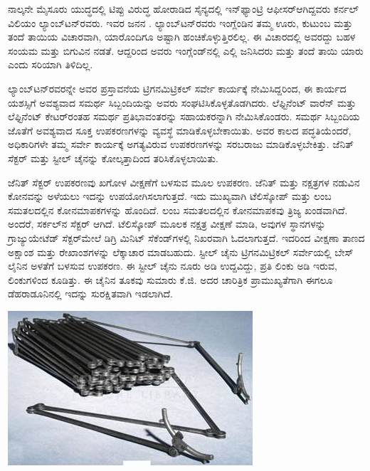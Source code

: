 ನಾಲ್ಕನೇ ಮೈಸೂರು ಯುದ್ಧದಲ್ಲಿ ಟಿಪ್ಪು ವಿರುದ್ಧ ಹೋರಾಡಿದ ಸೈನ್ಯದಲ್ಲಿ ಇನ್​ಫ್ಯಾಂಟ್ರಿ ಆಫೀಸರ್​ ಆಗಿದ್ದವರು ಕರ್ನಲ್​ ವಿಲಿಯಂ ಲ್ಯಾಂಬ್​ಟನ್​ರವರು. ಇವರ ಜನನ . ಲ್ಯಾಂಬ್​ಟನ್​ರವರು ಇಂಗ್ಲೆಂಡಿನ ತಮ್ಮ ಊರು, ಕುಟುಂಬ ಮತ್ತು ತಂದೆ ತಾಯಿಯ ವಿಚಾರವಾಗಿ, ಯಾರೊಂದಿಗೂ ಅಷ್ಟಾಗಿ ಹಂಚಿಕೊಳ್ಳುತ್ತಿರಲಿಲ್ಲ. ಈ ವಿಚಾರದಲ್ಲಿ ಅವರದ್ದು ಬಹಳ ಸಂಯಮ ಮತ್ತು ಬಿಗುವಿನ ನಡತೆ. ಆದ್ದರಿಂದ ಅವರು ಇಂಗ್ಲೆಂಡ್​ನಲ್ಲಿ ಎಲ್ಲಿ ಜನಿಸಿದರು ಮತ್ತು ತಂದೆ ತಾಯಿ ಯಾರು ಎಂದು ಸರಿಯಾಗಿ ತಿಳಿದಿಲ್ಲ.

ಲ್ಯಾಂಬ್​ಟನ್​ರವರನ್ನೇ ಅವರ ಪ್ರಸ್ತಾವನೆಯ ಟ್ರಿಗನಮಿಟ್ರಿಕಲ್​ ಸರ್ವೇ ಕಾರ್ಯಕ್ಕೆ ನೇಮಿಸಿದ್ದರಿಂದ, ಈ ಕಾರ್ಯದ ಯಶಸ್ಸಿಗೆ ಅವಶ್ಯವಾದ ಸಮರ್ಥ ಸಿಬ್ಬಂದಿಯನ್ನು ಅವರು ಸಂಘಟಿಸಿಕೊಳ್ಳತೊಡಗಿದರು. ಲೆಫ್ಟಿನೆಂಟ್​ ವಾರೆನ್​ ಮತ್ತು ಲೆಫ್ಟಿನೆಂಟ್​ ಕೇಟರ್​ರಂತಹ ಸಮರ್ಥ ಪ್ರತಿಭಾವಂತರನ್ನು ಸಹಾಯಕರನ್ನಾಗಿ ನೇಮಿಸಿಕೊಂಡರು. ಸಮರ್ಥ ಸಿಬ್ಬಂದಿಯ ಜೊತೆಗೆ ಅವಶ್ಯವಾದ ಸೂಕ್ತ ಉಪಕರಣಗಳನ್ನು ವ್ಯವಸ್ಥೆ ಮಾಡಿಕೊಳ್ಳಬೇಕಾಯಿತು. ಅವರ ಕಾಲದ ಪದ್ಧತಿಯೆಂದರೆ, ಅಧಿಕಾರಿಗಳೇ ತಮ್ಮ ಸರ್ವೇ ಕಾರ್ಯಕ್ಕೆ ಅಗತ್ಯವಿರುವ ಉಪಕರಣಗಳನ್ನು ಸರಬರಾಜು ಮಾಡಿಕೊಳ್ಳಬೇಕಿತ್ತು. ಜೆನಿತ್​ ಸೆಕ್ಟರ್​ ಮತ್ತು ಸ್ಟೀಲ್​ ಚೈನನ್ನು ಕೋಲ್ಕತ್ತಾದಿಂದ ತರಿಸಿಕೊಳ್ಳಲಾಯಿತು.

ಜೆನಿತ್​ ಸೆಕ್ಟರ್​ ಉಪಕರಣವು ಖಗೋಳ ವೀಕ್ಷಣೆಗೆ ಬಳಸುವ ಮೂಲ ಉಪಕರಣ. ಜೆನಿತ್​ ಮತ್ತು ನಕ್ಷತ್ರಗಳ ನಡುವಿನ ಕೋನವನ್ನು ಅಳೆಯಲು ಇದನ್ನು ಉಪಯೋಗಿಸಲಾಗುತ್ತದೆ. ಇದು ಮುಖ್ಯವಾಗಿ ಟೆಲಿಸ್ಕೋಪ್​ ಮತ್ತು ಲಂಬ ಸಮತಲದಲ್ಲಿನ ಕೋನಮಾಪಕಗಳನ್ನು ಹೊಂದಿದೆ. ಲಂಬ ಸಮತಲದಲ್ಲಿನ ಕೋನಮಾಪಕವು ತ್ರಿಜ್ಯ ಖಂಡವಾಗಿದೆ. ಅಂದರೆ, ಸರ್ಕಲ್​ನ ಸೆಕ್ಟರ್​ ಆಗಿದೆ. ಟೆಲಿಸ್ಕೋಪ್​ ಮೂಲಕ ನಕ್ಷತ್ರ ವೀಕ್ಷಣೆ ಮಾಡಿ, ಅವುಗಳ ಸ್ಥಾನಗಳನ್ನು ಗ್ರಾಜ್ಯುಯೇಟೆಡ್​ ಸೆಕ್ಟರ್​ ಮೇಲೆ ಡಿಗ್ರಿ ಮಿನಿಟ್​ ಸೆಕೆಂಡ್​ಗಳಲ್ಲಿ ನಿಖರವಾಗಿ ಓದಲಾಗುತ್ತದೆ. ಇದರಿಂದ ವೀಕ್ಷಣಾ ತಾಣದ ಅಕ್ಷಾಂಶ ಮತ್ತು ರೇಖಾಂಶಗಳನ್ನು ಲೆಕ್ಕಾಚಾರ ಮಾಡಬಹುದು. ಸ್ಟೀಲ್​ ಚೈನು ಟ್ರಿಗನಮಿಟ್ರಿಕಲ್​ ಸರ್ವೇಯಲ್ಲಿ ಬೇಸ್​ಲೈನಿನ ಅಳತೆಗೆ ಬಳಸುವ ಉಪಕರಣ. ಈ ಸ್ಟೀಲ್​ ಚೈನು ನೂರು ಅಡಿ ಉದ್ದವಿದ್ದು, ಪ್ರತಿ ಲಿಂಕು  ಅಡಿ ಇರುವ,  ಲಿಂಕುಗಳಿಂದ ಕೂಡಿತ್ತು. ಈ ಚೈನಿನ ತೂಕವು ಸುಮಾರು  ಕೆ.ಜಿ. ಅದರ ಚಾರಿತ್ರಿಕ ಪ್ರಾಮುಖ್ಯತೆಗಾಗಿ ಈಗಲೂ ಡೆಹರಾಡೂನಿನಲ್ಲಿ ಇದನ್ನು ಸುರಕ್ಷಿತವಾಗಿ ಇಡಲಾಗಿದೆ.

\begin{center}
\includegraphics[scale=0.6]{"images/image006.jpg"}
\end{center}

